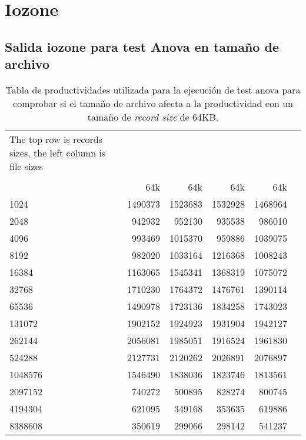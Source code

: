 \section{Iozone}
\subsection{Salida iozone para test Anova en tamaño de archivo}
\begin{table}[H]\centering
\caption{Tabla de productividades utilizada para la ejecución de test anova para comprobar si el tamaño de archivo afecta a la productividad con un tamaño de \textit{record size} de 64KB.}\label{tab:tabla_salida_anova_archivo}
\scriptsize
\begin{tabular}{lrrrrr}\toprule
The top row is records sizes, the left column is file sizes & & & & \\
& & & & \\
&64k &64k &64k &64k \\\midrule
1024 &1490373 &1523683 &1532928 &1468964 \\
2048 &942932 &952130 &935538 &986010 \\
4096 &993469 &1015370 &959886 &1039075 \\
8192 &982020 &1033164 &1216368 &1008243 \\
16384 &1163065 &1545341 &1368319 &1075072 \\
32768 &1710230 &1764372 &1476761 &1390114 \\
65536 &1490978 &1723136 &1834258 &1743023 \\
131072 &1902152 &1924923 &1931904 &1942127 \\
262144 &2056081 &1985051 &1916524 &1961830 \\
524288 &2127731 &2120262 &2026891 &2076897 \\
1048576 &1546490 &1838036 &1823746 &1813561 \\
2097152 &740272 &500895 &828274 &800745 \\
4194304 &621095 &349168 &353635 &619886 \\
8388608 &350619 &299066 &298142 &541237 \\
\bottomrule
\end{tabular}
\end{table}


